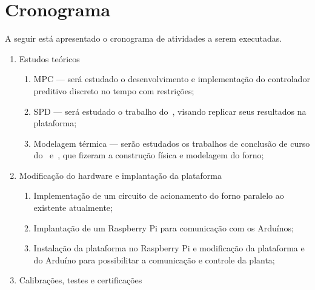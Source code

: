 
\chapter{Cronograma}%
\label{sec:chronogram}

A seguir está apresentado o cronograma de atividades a serem executadas.

\renewcommand{\labelenumii}{\theenumii}
\renewcommand{\theenumii}{\theenumi.\arabic{enumii}.}

\begin{enumerate}
      \item Estudos teóricos
            \begin{enumerate}
                  \item MPC --- será estudado o desenvolvimento e implementação
                        do controlador preditivo discreto no tempo com
                        restrições;
                  \item SPD --- será estudado o trabalho
                        do~\textcite{masterthesis:nelson}, visando replicar
                        seus resultados na plataforma;
                  \item Modelagem térmica --- serão estudados os trabalhos de
                        conclusão de curso do~\textcite{misc:nelson}
                        e~\textcite{misc:valle-silva}, que fizeram a
                        construção física e modelagem do forno;
            \end{enumerate}
      \item Modificação do hardware e implantação da plataforma
            \begin{enumerate}
                  \item Implementação de um circuito de acionamento do forno
                        paralelo ao existente atualmente;
                  \item Implantação de um Raspberry Pi para comunicação com os
                        Arduínos;
                  \item Instalação da plataforma no Raspberry Pi e modificação
                        da plataforma e do Arduíno para possibilitar a
                        comunicação e controle da planta;
            \end{enumerate}
      \item Calibrações, testes e certificações
            \begin{enumerate}

\end{enumerate}
\end{enumerate}
